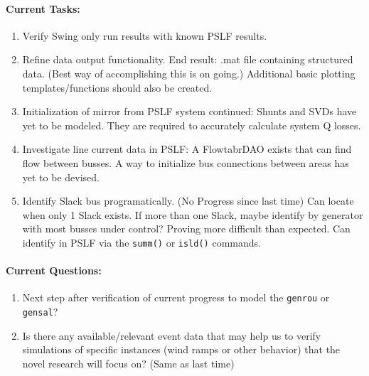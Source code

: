 \documentclass[12pt]{article}
\begin{document}
	\paragraph{Current Tasks:}
	\begin{enumerate}
		\item Verify Swing only run results with known PSLF results.
		
		\item Refine data output functionality.
		\subitem End result: .mat file containing structured data.
		\subitem (Best way of accomplishing this is on going.)
		\subitem Additional basic plotting templates/functions should also be created.
		
		\item Initialization of mirror from PSLF system continued:
		\subitem Shunts and SVDs have yet to be modeled. They are required to accurately calculate system Q losses. 
		
		\item Investigate line current data in PSLF:
		\subitem A FlowtabrDAO exists that can find flow between busses. A way to initialize bus connections between areas has yet to be devised.
		
		\item Identify Slack bus programatically. (No Progress since last time)
		\subitem Can locate when only 1 Slack exists. If more than one Slack, maybe identify by generator with most busses under control? Proving more difficult than expected. Can identify in PSLF via the \verb|summ()| or \verb|isld()| commands. 
		
	\end{enumerate}
	\paragraph{Current Questions:}
	\begin{enumerate}
		
		
		\item Next step after verification of current progress to model the \verb|genrou| or \verb|gensal|?
		
		\item Is there any available/relevant event data that may help us to verify simulations of specific instances (wind ramps or other behavior) that the novel research will focus on? (Same as last time)
	\end{enumerate}
	\begin{comment}
	\paragraph{Random Thoughts:}
	\begin{enumerate}
	\item Numerical integration at beginning of simulation may require extra care as to avoid out of index errors. -Maybe not because python can do limited negative indexing.
	\end{enumerate}
	\end{comment}
\pagebreak
\end{document}
